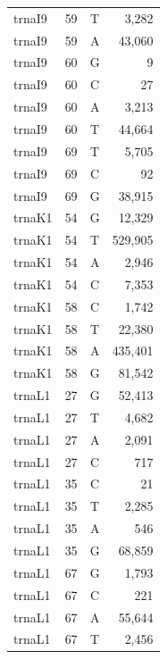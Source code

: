 \documentclass[12pt]{rockefeller}
\begin{document}
\begin{tiny}
\begin{longtable}{|l|r|c|r|}
  trnaI9 &        59 &          T &      3,282 \\
  trnaI9 &        59 &          A &     43,060 \\
  trnaI9 &        60 &          G &          9 \\
  trnaI9 &        60 &          C &         27 \\
  trnaI9 &        60 &          A &      3,213 \\
  trnaI9 &        60 &          T &     44,664 \\
  trnaI9 &        69 &          T &      5,705 \\
  trnaI9 &        69 &          C &         92 \\
  trnaI9 &        69 &          G &     38,915 \\
  trnaK1 &        54 &          G &     12,329 \\
  trnaK1 &        54 &          T &    529,905 \\
  trnaK1 &        54 &          A &      2,946 \\
  trnaK1 &        54 &          C &      7,353 \\
  trnaK1 &        58 &          C &      1,742 \\
  trnaK1 &        58 &          T &     22,380 \\
  trnaK1 &        58 &          A &    435,401 \\
  trnaK1 &        58 &          G &     81,542 \\
  trnaL1 &        27 &          G &     52,413 \\
  trnaL1 &        27 &          T &      4,682 \\
  trnaL1 &        27 &          A &      2,091 \\
  trnaL1 &        27 &          C &        717 \\
  trnaL1 &        35 &          C &         21 \\
  trnaL1 &        35 &          T &      2,285 \\
  trnaL1 &        35 &          A &        546 \\
  trnaL1 &        35 &          G &     68,859 \\
  trnaL1 &        67 &          G &      1,793 \\
  trnaL1 &        67 &          C &        221 \\
  trnaL1 &        67 &          A &     55,644 \\
  trnaL1 &        67 &          T &      2,456 \\

\end{longtable}
\end{tiny}
\end{document}
